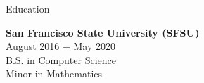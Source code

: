 \documentclass{resume} %
\begin{document}

\begin{rSection}{Education}
\begin{multicols}{2}

{\bf San Francisco State University (SFSU)}\\
August 2016 $-$ May 2020\\
B.S. in Computer Science\\
Minor in Mathematics


\end{multicols}
\end{rSection}

\end{document}
